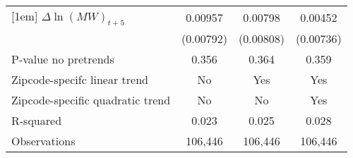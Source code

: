 {\begin{tabular}{l*{3}{c}}
[1em]
$\Delta \ln(MW)_{t+5}$&  0.00957         &  0.00798         &  0.00452         \\
          &(0.00792)         &(0.00808)         &(0.00736)         \\
\hline
P-value no pretrends&    0.356         &    0.364         &    0.359         \\
Zipcode-specifc linear trend&       No         &      Yes         &      Yes         \\
Zipcode-specific quadratic trend&       No         &       No         &      Yes         \\
R-squared &    0.023         &    0.025         &    0.028         \\
Observations&  106,446         &  106,446         &  106,446         \\
\hline\hline
\end{tabular}
}
